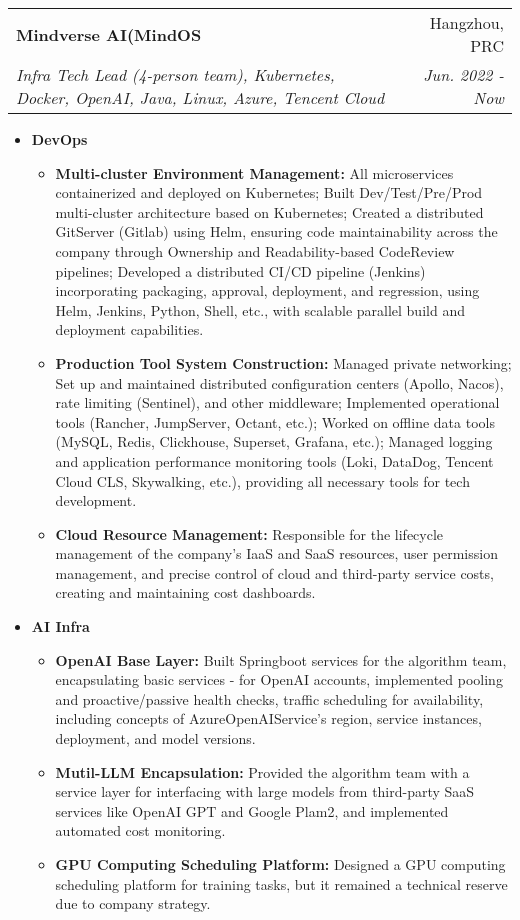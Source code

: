\documentclass[letterpaper,11pt]{article}
\makeatletter
\newcommand{\resumeSubheading}[4]{
	\vspace{-1pt}\item
	\begin{tabular*}{0.97\textwidth}[t]{l@{\extracolsep{\fill}}r}
		\textbf{#1} & #2 \\
		\textit{\small#3} & \textit{\small #4} \\
	\end{tabular*}\vspace{-5pt}
}
\makeatother
\begin{document}
\begin{spacing}{0.86}
	\resumeSubheading
	{Mindverse AI(MindOS}{Hangzhou, PRC}
	{Infra Tech Lead (4-person team), Kubernetes, Docker, OpenAI, Java, Linux, Azure, Tencent Cloud}{Jun. 2022 - Now}
	\begin{itemize}
		\item \textbf{DevOps}
		\begin{itemize}
			\item
			\textbf{Multi-cluster Environment Management: }All microservices containerized and deployed on Kubernetes; Built Dev/Test/Pre/Prod multi-cluster architecture based on Kubernetes; Created a distributed GitServer (Gitlab) using Helm, ensuring code maintainability across the company through Ownership and Readability-based CodeReview pipelines; Developed a distributed CI/CD pipeline (Jenkins) incorporating packaging, approval, deployment, and regression, using Helm, Jenkins, Python, Shell, etc., with scalable parallel build and deployment capabilities.
			\item
			\textbf{Production Tool System Construction: }Managed private networking; Set up and maintained distributed configuration centers (Apollo, Nacos), rate limiting (Sentinel), and other middleware; Implemented operational tools (Rancher, JumpServer, Octant, etc.); Worked on offline data tools (MySQL, Redis, Clickhouse, Superset, Grafana, etc.); Managed logging and application performance monitoring tools (Loki, DataDog, Tencent Cloud CLS, Skywalking, etc.), providing all necessary tools for tech development.
			\item
			\textbf{Cloud Resource Management: }Responsible for the lifecycle management of the company's IaaS and SaaS resources, user permission management, and precise control of cloud and third-party service costs, creating and maintaining cost dashboards.
		\end{itemize}
		
		\item
		\textbf{AI Infra}
		\begin{itemize}
			\item
			\textbf{OpenAI Base Layer: }Built Springboot services for the algorithm team, encapsulating basic services - for OpenAI accounts, implemented pooling and proactive/passive health checks, traffic scheduling for availability, including concepts of AzureOpenAIService's region, service instances, deployment, and model versions.
			\item
			\textbf{Mutil-LLM Encapsulation: }Provided the algorithm team with a service layer for interfacing with large models from third-party SaaS services like OpenAI GPT and Google Plam2, and implemented automated cost monitoring.
			\item
			\textbf{GPU Computing Scheduling Platform: }Designed a GPU computing scheduling platform for training tasks, but it remained a technical reserve due to company strategy.
		\end{itemize}
		

\end{itemize}
\end{spacing}
\end{document}
